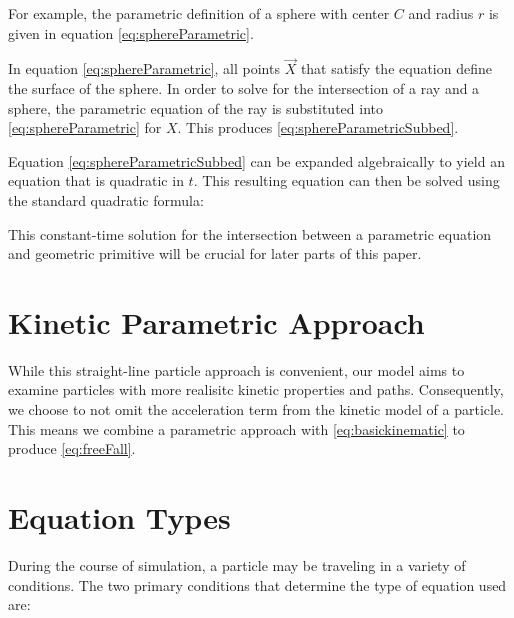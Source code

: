 For example, the parametric definition of a sphere with center $C$ and radius $r$ is given in equation \eqref{eq:sphereParametric}.

 {
	\label{eq:sphereParametric}
}

In equation \eqref{eq:sphereParametric}, all points $\vec{X}$ that satisfy the equation define the surface of the sphere. In order to solve for the intersection of a ray and a sphere, the parametric equation of the ray is substituted into \eqref{eq:sphereParametric} for $X$. This produces \eqref{eq:sphereParametricSubbed}.

 {
	\label{eq:sphereParametricSubbed}
}


Equation \eqref{eq:sphereParametricSubbed} can be expanded algebraically to yield an equation that is quadratic in $t$. This resulting equation can then be solved using the standard quadratic formula:

 {
	\label{eq:quadraticFormula}
}

This constant-time solution for the intersection between a parametric equation and geometric primitive will be crucial for later parts of this paper.

\section{Kinetic Parametric Approach}

While this straight-line particle approach is convenient, our model aims to examine particles with more realisitc kinetic properties and paths. Consequently, we choose to not omit the acceleration term from the kinetic model of a particle. This means we combine a parametric approach with \eqref{eq:basickinematic} to produce \eqref{eq:freeFall}.


\section{Equation Types}

During the course of simulation, a particle may be traveling in a variety of conditions. The two primary conditions that determine the type of equation used are:

